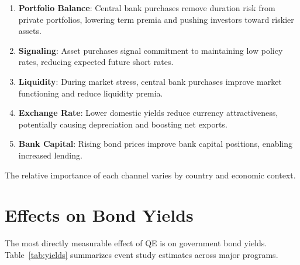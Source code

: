 \documentclass[11pt,a4paper]{article}
\begin{document}
\begin{enumerate}
    \item \textbf{Portfolio Balance}: Central bank purchases remove duration risk from private portfolios, lowering term premia and pushing investors toward riskier assets.

    \item \textbf{Signaling}: Asset purchases signal commitment to maintaining low policy rates, reducing expected future short rates.

    \item \textbf{Liquidity}: During market stress, central bank purchases improve market functioning and reduce liquidity premia.

    \item \textbf{Exchange Rate}: Lower domestic yields reduce currency attractiveness, potentially causing depreciation and boosting net exports.

    \item \textbf{Bank Capital}: Rising bond prices improve bank capital positions, enabling increased lending.
\end{enumerate}

The relative importance of each channel varies by country and economic context.

\section{Effects on Bond Yields}

The most directly measurable effect of QE is on government bond yields. Table~\ref{tab:yields} summarizes event study estimates across major programs.
\end{document}
